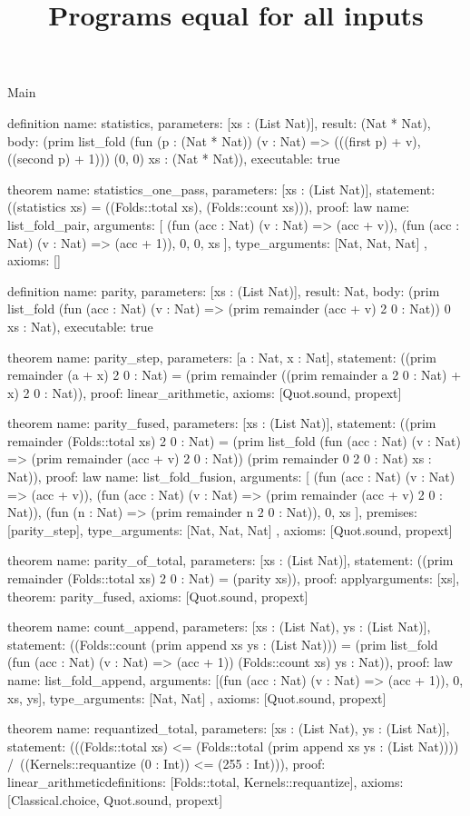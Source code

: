 \begin{lexlean}{Main}
\title{Programs equal for all inputs}
\begin{semanticmodule}
definition{
  name: statistics,
  parameters: [xs : (List Nat)],
  result: (Nat * Nat),
  body: (prim list_fold (fun (p : (Nat * Nat)) (v : Nat) => (((first p) + v), ((second p) + 1))) (0, 0) xs : (Nat * Nat)),
  executable: true
}

theorem{
  name: statistics_one_pass,
  parameters: [xs : (List Nat)],
  statement: ((statistics xs) = ((Folds::total xs), (Folds::count xs))),
  proof: law{
    name: list_fold_pair,
    arguments: [
      (fun (acc : Nat) (v : Nat) => (acc + v)),
      (fun (acc : Nat) (v : Nat) => (acc + 1)),
      0,
      0,
      xs
    ],
    type_arguments: [Nat, Nat, Nat]
  },
  axioms: []
}

definition{
  name: parity,
  parameters: [xs : (List Nat)],
  result: Nat,
  body: (prim list_fold (fun (acc : Nat) (v : Nat) => (prim remainder (acc + v) 2 0 : Nat)) 0 xs : Nat),
  executable: true
}

theorem{
  name: parity_step,
  parameters: [a : Nat, x : Nat],
  statement: ((prim remainder (a + x) 2 0 : Nat) = (prim remainder ((prim remainder a 2 0 : Nat) + x) 2 0 : Nat)),
  proof: linear_arithmetic{},
  axioms: [Quot.sound, propext]
}

theorem{
  name: parity_fused,
  parameters: [xs : (List Nat)],
  statement: ((prim remainder (Folds::total xs) 2 0 : Nat) = (prim list_fold (fun (acc : Nat) (v : Nat) => (prim remainder (acc + v) 2 0 : Nat)) (prim remainder 0 2 0 : Nat) xs : Nat)),
  proof: law{
    name: list_fold_fusion,
    arguments: [
      (fun (acc : Nat) (v : Nat) => (acc + v)),
      (fun (acc : Nat) (v : Nat) => (prim remainder (acc + v) 2 0 : Nat)),
      (fun (n : Nat) => (prim remainder n 2 0 : Nat)),
      0,
      xs
    ],
    premises: [parity_step],
    type_arguments: [Nat, Nat, Nat]
  },
  axioms: [Quot.sound, propext]
}

theorem{
  name: parity_of_total,
  parameters: [xs : (List Nat)],
  statement: ((prim remainder (Folds::total xs) 2 0 : Nat) = (parity xs)),
  proof: apply{arguments: [xs], theorem: parity_fused},
  axioms: [Quot.sound, propext]
}

theorem{
  name: count_append,
  parameters: [xs : (List Nat), ys : (List Nat)],
  statement: ((Folds::count (prim append xs ys : (List Nat))) = (prim list_fold (fun (acc : Nat) (v : Nat) => (acc + 1)) (Folds::count xs) ys : Nat)),
  proof: law{
    name: list_fold_append,
    arguments: [(fun (acc : Nat) (v : Nat) => (acc + 1)), 0, xs, ys],
    type_arguments: [Nat, Nat]
  },
  axioms: [Quot.sound, propext]
}

theorem{
  name: requantized_total,
  parameters: [xs : (List Nat), ys : (List Nat)],
  statement: (((Folds::total xs) <= (Folds::total (prim append xs ys : (List Nat)))) /\ ((Kernels::requantize (0 : Int)) <= (255 : Int))),
  proof: linear_arithmetic{definitions: [Folds::total, Kernels::requantize]},
  axioms: [Classical.choice, Quot.sound, propext]
}
\end{semanticmodule}
\end{lexlean}
